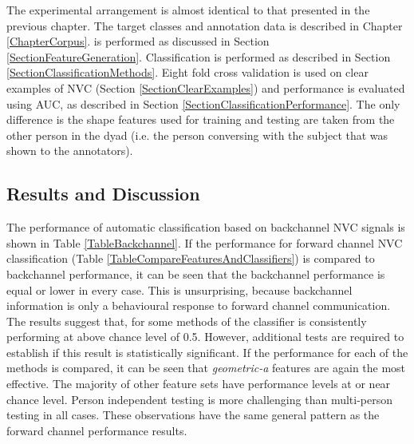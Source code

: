 The experimental arrangement is almost identical to that presented in the previous chapter. The target classes and annotation data is described in Chapter \ref{ChapterCorpus}. \FeatureGeneration is performed as discussed in Section \ref{SectionFeatureGeneration}. Classification is performed as described in Section \ref{SectionClassificationMethods}. Eight fold cross validation is used on clear examples of \ac{NVC} (Section \ref{SectionClearExamples}) and performance is evaluated using \ac{AUC}, as described in Section \ref{SectionClassificationPerformance}. The only difference is the shape features used for training and testing are taken from the other person in the dyad (i.e. the person conversing with the subject that was shown to the annotators).

\subsection{Results and Discussion}



The performance of automatic classification based on backchannel \ac{NVC} signals is shown in Table \ref{TableBackchannel}. If the performance for forward channel \ac{NVC} classification (Table \ref{TableCompareFeaturesAndClassifiers}) is compared to backchannel performance, it can be seen that the backchannel performance is equal or lower in every case. This is unsurprising, because backchannel information is only a behavioural response to forward channel communication. The results suggest that, for some methods of \featureGenerationComma the classifier is consistently performing at above chance level of 0.5. However, additional tests are required to establish if this result is statistically significant. If the performance for each of the \featureGeneration methods is compared, it can be seen that \textit{geometric-a} features are again the most effective. The majority of other feature sets have performance levels at or near chance level. Person independent testing is more challenging than multi-person testing in all cases. 
These observations have the same general pattern as the forward channel performance results.

